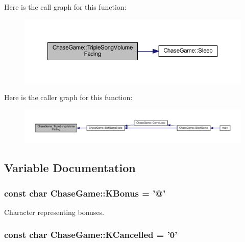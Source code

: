 Here is the call graph for this function\-:
\nopagebreak
\begin{figure}[H]
\begin{center}
\leavevmode
\includegraphics[width=350pt]{namespace_chase_game_a3b9e1d486d981f5332d23142eb4777b7_cgraph}
\end{center}
\end{figure}




Here is the caller graph for this function\-:
\nopagebreak
\begin{figure}[H]
\begin{center}
\leavevmode
\includegraphics[width=350pt]{namespace_chase_game_a3b9e1d486d981f5332d23142eb4777b7_icgraph}
\end{center}
\end{figure}




\subsection{Variable Documentation}
\hypertarget{namespace_chase_game_a202a236c81f69bdfc031abd6654b8132}{
\subsubsection[{K\-Bonus}]{\setlength{\rightskip}{0pt plus 5cm}const char Chase\-Game\-::\-K\-Bonus = '@'}}\label{namespace_chase_game_a202a236c81f69bdfc031abd6654b8132}


Character representing bonuses. 

\hypertarget{namespace_chase_game_a12d6411bb9a72150acba6060bb1587e1}{
\subsubsection[{K\-Cancelled}]{\setlength{\rightskip}{0pt plus 5cm}const char Chase\-Game\-::\-K\-Cancelled = '0'}}\label{namespace_chase_game_a12d6411bb9a72150acba6060bb1587e1}


